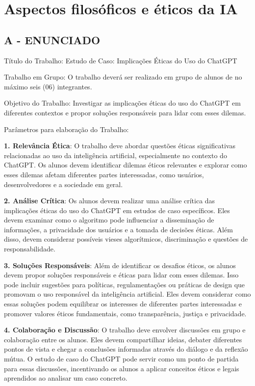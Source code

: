 \label{ap:ap07}
\chapter{Aspectos filosóficos e éticos da IA}
\section*{\textbf{A - ENUNCIADO}}

Título do Trabalho: {\textquotedbl}Estudo de Caso: Implicações Éticas do Uso do ChatGPT{\textquotedbl}



Trabalho em Grupo: O trabalho deverá ser realizado em grupo de alunos de no máximo seis (06) integrantes.



Objetivo do Trabalho: Investigar as implicações éticas do uso do ChatGPT em diferentes contextos e propor soluções
responsáveis para lidar com esses dilemas.

Parâmetros para elaboração do Trabalho:



\textbf{1. Relevância Ética}: O trabalho deve abordar questões éticas significativas relacionadas ao uso da inteligência
artificial, especialmente no contexto do ChatGPT. Os alunos devem identificar dilemas éticos relevantes e explorar como
esses dilemas afetam diferentes partes interessadas, como usuários, desenvolvedores e a sociedade em geral.

\textbf{2. Análise Crítica}: Os alunos devem realizar uma análise crítica das implicações éticas do uso do ChatGPT em
estudos de caso específicos. Eles devem examinar como o algoritmo pode influenciar a disseminação de informações, a
privacidade dos usuários e a tomada de decisões éticas. Além disso, devem considerar possíveis vieses algorítmicos,
discriminação e questões de responsabilidade.

\textbf{3. Soluções Responsáveis}: Além de identificar os desafios éticos, os alunos devem propor soluções responsáveis
e éticas para lidar com esses dilemas. Isso pode incluir sugestões para políticas, regulamentações ou práticas de
design que promovam o uso responsável da inteligência artificial. Eles devem considerar como essas soluções podem
equilibrar os interesses de diferentes partes interessadas e promover valores éticos fundamentais, como transparência,
justiça e privacidade.

\textbf{4. Colaboração e Discussão}: O trabalho deve envolver discussões em grupo e colaboração entre os alunos. Eles
devem compartilhar ideias, debater diferentes pontos de vista e chegar a conclusões informadas através do diálogo e da
reflexão mútua. O estudo de caso do ChatGPT pode servir como um ponto de partida para essas discussões, incentivando os
alunos a aplicar conceitos éticos e legais aprendidos ao analisar um caso concreto.

